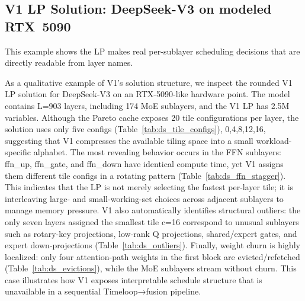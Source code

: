 
\subsection{V1 LP Solution: DeepSeek-V3 on modeled RTX~5090}
This example shows the LP makes real per-sublayer scheduling decisions that are directly readable from layer names.


As a qualitative example of V1’s solution structure, we inspect the rounded V1 LP solution for DeepSeek-V3 on an RTX-5090-like hardware point. The model contains L=903 layers, including 174 MoE sublayers, and the V1 LP has 2.5M variables. Although the Pareto cache exposes 20 tile configurations per layer, the solution uses only five configs (Table~\ref{tab:ds_tile_configs}), {0,4,8,12,16}, suggesting that V1 compresses the available tiling space into a small workload-specific alphabet. The most revealing behavior occurs in the FFN sublayers: ffn\_up, ffn\_gate, and ffn\_down have identical compute time, yet V1 assigns them different tile configs in a rotating pattern (Table~\ref{tab:ds_ffn_stagger}). This indicates that the LP is not merely selecting the fastest per-layer tile; it is interleaving large- and small-working-set choices across adjacent sublayers to manage memory pressure. V1 also automatically identifies structural outliers: the only seven layers assigned the smallest tile c=16 correspond to unusual sublayers such as rotary-key projections, low-rank Q projections, shared/expert gates, and expert down-projections (Table~\ref{tab:ds_outliers}). Finally, weight churn is highly localized: only four attention-path weights in the first block are evicted/refetched (Table~\ref{tab:ds_evictions}), while the MoE sublayers stream without churn. This case illustrates how V1 exposes interpretable schedule structure that is unavailable in a sequential Timeloop→fusion pipeline.

